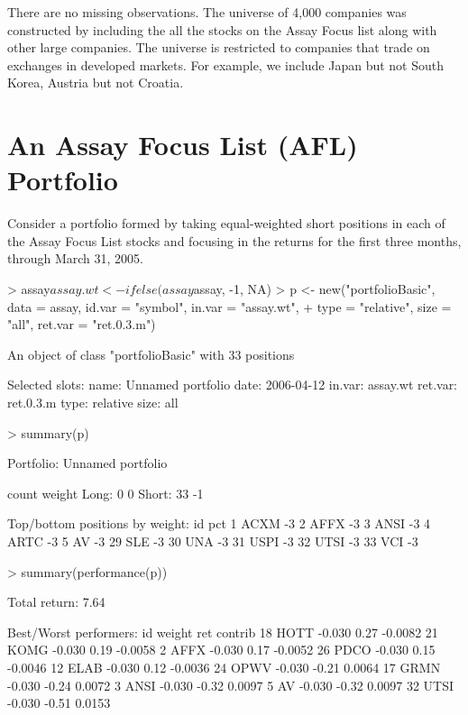 \documentclass{article}
\begin{document}
There are no missing observations. The universe of 4,000 companies was
constructed by including the all the stocks on the Assay Focus list
along with other large companies. The universe is restricted to
companies that trade on exchanges in developed markets. For example,
we include Japan but not South Korea, Austria but not Croatia.

\section{An Assay Focus List (AFL) Portfolio}

Consider a portfolio formed by taking equal-weighted short positions
in each of the Assay Focus List stocks and focusing in the returns for the
first three months, through March 31, 2005.

\begin{Schunk}
\begin{Sinput}
> assay$assay.wt <- ifelse(assay$assay, -1, NA)
> p <- new("portfolioBasic", data = assay, id.var = "symbol", in.var = "assay.wt", 
+     type = "relative", size = "all", ret.var = "ret.0.3.m")
\end{Sinput}
\begin{Soutput}
An object of class "portfolioBasic" with 33 positions

Selected slots:
name: Unnamed portfolio
date: 2006-04-12
in.var: assay.wt
ret.var: ret.0.3.m
type: relative
size: all
\end{Soutput}
\begin{Sinput}
> summary(p)
\end{Sinput}
\begin{Soutput}
Portfolio: Unnamed portfolio

        count       weight
Long:       0            0 
Short:     33           -1 

Top/bottom positions by weight:
     id pct
1  ACXM  -3
2  AFFX  -3
3  ANSI  -3
4  ARTC  -3
5    AV  -3
29  SLE  -3
30  UNA  -3
31 USPI  -3
32 UTSI  -3
33  VCI  -3
\end{Soutput}
\begin{Sinput}
> summary(performance(p))
\end{Sinput}
\begin{Soutput}
Total return:  7.64 % 

Best/Worst performers:
     id weight   ret contrib
18 HOTT -0.030  0.27 -0.0082
21 KOMG -0.030  0.19 -0.0058
2  AFFX -0.030  0.17 -0.0052
26 PDCO -0.030  0.15 -0.0046
12 ELAB -0.030  0.12 -0.0036
24 OPWV -0.030 -0.21  0.0064
17 GRMN -0.030 -0.24  0.0072
3  ANSI -0.030 -0.32  0.0097
5    AV -0.030 -0.32  0.0097
32 UTSI -0.030 -0.51  0.0153
\end{Soutput}
\end{Schunk}
\end{document}
